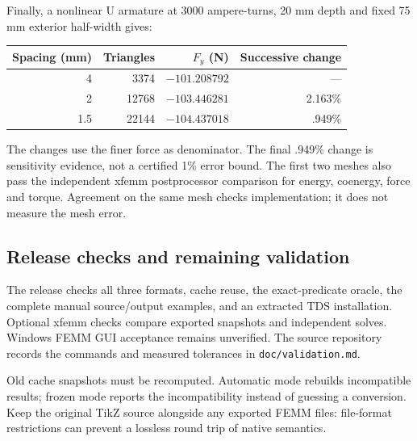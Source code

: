 Finally, a nonlinear U armature at 3000 ampere-turns, 20 mm depth and fixed
75 mm exterior half-width gives:
\begin{center}
\begin{tabular}{rrrr}
\toprule Spacing (mm) & Triangles & $F_y$ (N) & Successive change\\
\midrule
4 & 3374 & $-101.208792$ & ---\\
2 & 12768 & $-103.446281$ & 2.163\%\\
1.5 & 22144 & $-104.437018$ & .949\%\\
\bottomrule
\end{tabular}
\end{center}
The changes use the finer force as denominator. The final .949\% change
is sensitivity evidence, not a certified 1\% error bound. The first two
meshes also pass the independent xfemm postprocessor comparison for energy,
coenergy, force and torque. Agreement on the same mesh checks implementation;
it does not measure the mesh error.

\subsection{Release checks and remaining validation}
The release checks all three formats, cache reuse, the exact-predicate oracle,
the complete manual source/output examples, and an extracted TDS
installation. Optional xfemm checks compare exported snapshots and independent
solves. Windows FEMM GUI acceptance remains unverified. The source repository
records the commands and measured tolerances in
\nolinkurl{doc/validation.md}.

Old cache snapshots must be recomputed. Automatic mode rebuilds incompatible
results; frozen mode reports the incompatibility instead of guessing a
conversion. Keep the original TikZ source alongside any exported FEMM files:
file-format restrictions can prevent a lossless round trip of native semantics.
